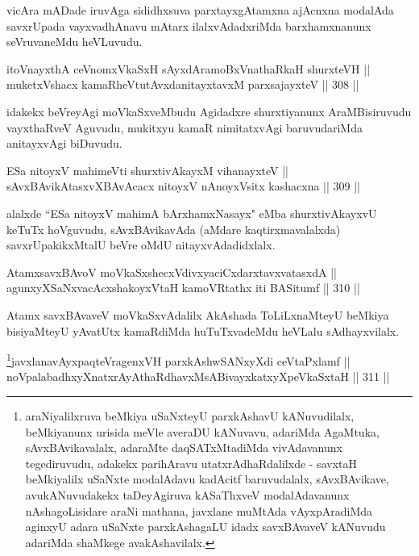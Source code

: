 \begin{artha}
vicAra mADade iruvAga sididhxsuva parxtayxgAtamxna ajAcnxna
modalAda savxrUpada vayxvadhAnavu mAtarx ilalxvAdadxriMda
barxhamxnanunx seVruvaneMdu heVLuvudu.
\end{artha}


\begin{shl}
itoV\s nayxthA ceVnomxVkaSxH sAyxdAramoBxV\s nathaRkaH shurxteVH || \\
muketxVshacx kamaRheVtutAvxdanitayxtavxM parxsajayxteV \hfill || 308 || 
\end{shl}

\begin{artha}
idakekx beVreyAgi moVkaSxveMbudu Agidadxre shurxtiyanunx
AraMBisiruvudu vayxthaRveV Aguvudu, mukitxyu kamaR nimitatxvAgi
baruvudariMda anitayxvAgi biDuvudu.
\end{artha}

\begin{shl}
ESa nitoyxV mahimeVti shurxtivAkayxM vihanayxteV || \\
sAvxBAvikAtasxvXBAvAcacx nitoyxV nAnoyxV\s sitx kashacxna \hfill || 309 ||  
\end{shl}

\begin{artha}
alalxde ``ESa nitoyxV mahimA bArxhamxNasayx" eMba shurxtivAkayxvU keTuTx
hoVguvudu, sAvxBAvikavAda (aMdare kaqtirxmavalalxda) savxrUpakikxMtalU
beVre oMdU nitayxvAdadidxlalx.
\end{artha}


\begin{shl}
AtamxsavxBAvoV moVkaSxshecxVdivxyaciCxdarxtavxvatasxdA || \\
agunxyXSaNxvacAcxshakoyxV\s taH kamoVRtathx iti BASitumf \hfill || 310 ||  
\end{shl}

\begin{artha}
Atamx savxBAvaveV moVkaSxvAdalilx AkAshada ToLiLxnaMteyU beMkiya
bisiyaMteyU yAvatUtx kamaRdiMda huTuTxvadeMdu heVLalu sAdhayxvilalx.
\end{artha}



\begin{shl}
\footnote{araNiyalilxruva beMkiya uSaNxteyU parxkAshavU kANuvudilalx,
beMkiyanunx urisida meVle averaDU kANuvavu, adariMda AgaMtuka,
sAvxBAvikavalalx, adaraMte daqSATxMtadiMda vivAdavanunx
tegediruvudu, adakekx parihAravu utatxrAdhaRdalilxde - savxtaH
beMkiyalilx uSaNxte modalAdavu kadAcitf baruvudalalx, sAvxBAvikave,
avukANuvudakekx taDeyAgiruva kASaThxveV modalAdavanunx
nAshagoLisidare araNi mathana, javxlane muMtAda vAyxpAradiMda
aginxyU adara uSaNxte parxkAshagaLU idadx savxBAvaveV kANuvudu
adariMda  shaMkege avakAshavilalx.}javxlanavAyxpaqteVragenxVH parxkAshwSANxyXdi ceVtaPxlamf || \\
noVpalabadhxyXnatxrAyAthaRdhavxMsABivayxkatxyXpeVkaSxtaH \hfill || 311 ||  
\end{shl}

